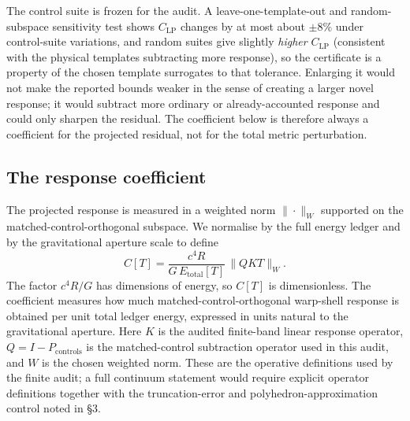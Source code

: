 \documentclass[11pt,a4paper]{article}
\begin{document}
The control suite is frozen for the audit. A leave-one-template-out and random-subspace sensitivity test shows $C_{\mathrm{LP}}$ changes by at most about $\pm8\%$ under control-suite variations, and random suites give slightly \emph{higher} $C_{\mathrm{LP}}$ (consistent with the physical templates subtracting more response), so the certificate is a property of the chosen template surrogates to that tolerance. Enlarging it would not make the reported bounds weaker in the sense of creating a larger novel response; it would subtract more ordinary or already-accounted response and could only sharpen the residual. The coefficient below is therefore always a coefficient for the projected residual, not for the total metric perturbation.

\subsection{The response coefficient}

The projected response is measured in a weighted norm $\|\cdot\|_{W}$ supported on the matched-control-orthogonal subspace. We normalise by the full energy ledger and by the gravitational aperture scale to define
\[
C[T] = \frac{c^{4}R}{G\,E_{\mathrm{total}}[T]}\,\bigl\| Q K T \bigr\|_{W}.
\]
The factor $c^{4}R/G$ has dimensions of energy, so $C[T]$ is dimensionless. The coefficient measures how much matched-control-orthogonal warp-shell response is obtained per unit total ledger energy, expressed in units natural to the gravitational aperture. Here $K$ is the audited finite-band linear response operator, $Q=I-P_{\mathrm{controls}}$ is the matched-control subtraction operator used in this audit, and $W$ is the chosen weighted norm. These are the operative definitions used by the finite audit; a full continuum statement would require explicit operator definitions together with the truncation-error and polyhedron-approximation control noted in §3.
\end{document}
